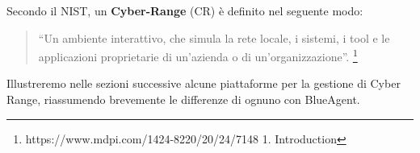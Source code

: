 Secondo il NIST, un \textbf{Cyber-Range} (CR) è definito nel seguente
modo:

\begin{quote}
``Un ambiente interattivo, che simula la rete locale, i sistemi, i tool
e le applicazioni proprietarie di un'azienda o di un'organizzazione''.
\footnote{\label{fn:ref_1}https://www.mdpi.com/1424-8220/20/24/7148 1. Introduction}
\end{quote}

Illustreremo nelle sezioni successive alcune piattaforme per la gestione
di Cyber Range, riassumendo brevemente le differenze di ognuno con
BlueAgent.
